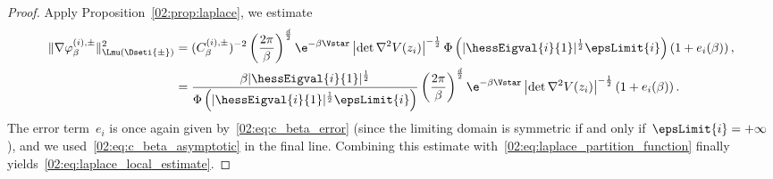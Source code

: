 \begin{proof}
            Apply Proposition~\ref{02:prop:laplace}, we estimate
            \begin{equation}
                \begin{aligned}
                \|\nabla\varphi_\beta^{(i),\pm}\|^2_{\Lmu(\Dseti{\pm})} &= (C_\beta^{(i),\pm})^{-2}\left(\frac{2\pi}{\beta}\right)^{\frac d2}\e^{-\beta \Vstar}\left|\det \nabla^2 V(z_i)\right|^{-\frac12}\Phi\left(|\hessEigval{i}{1}|^{\frac{1}{2}}\epsLimit{i}\right)\left(1+e_i(\beta)\right),\\
                &=\frac{\beta |\hessEigval{i}{1}|^{\frac12}}{\Phi\left(|\hessEigval{i}{1}|^{\frac{1}{2}}\epsLimit{i}\right)}\left(\frac{2\pi}{\beta}\right)^{\frac d2}\e^{-\beta \Vstar}\left|\det \nabla^2 V(z_i)\right|^{-\frac12}\left(1+e_i(\beta)\right).
                \end{aligned}
            \end{equation}
            The error term~$e_i$ is once again given by~\eqref{02:eq:c_beta_error} (since the limiting domain is symmetric if and only if~$\epsLimit{i}=+\infty$), and we used~\eqref{02:eq:c_beta_asymptotic} in the final line. Combining this estimate with~\eqref{02:eq:laplace_partition_function} finally yields~\eqref{02:eq:laplace_local_estimate}.
            

\end{proof}
